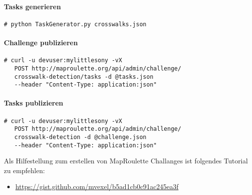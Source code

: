 \paragraph{Tasks generieren}
\begin{lstlisting}[style=BashInputStyle]
 # python TaskGenerator.py crosswalks.json
\end{lstlisting}

\paragraph{Challenge publizieren}
\begin{lstlisting}[style=BashInputStyle]
 # curl -u devuser:mylittlesony -vX 
   POST http://maproulette.org/api/admin/challenge/
   crosswalk-detection/tasks -d @tasks.json 
   --header "Content-Type: application:json"
\end{lstlisting}

\paragraph{Tasks publizieren}
\begin{lstlisting}[style=BashInputStyle]
 # curl -u devuser:mylittlesony -vX 
   POST http://maproulette.org/api/admin/challenge/
   crosswalk-detection -d @challenge.json 
   --header "Content-Type: application:json"
\end{lstlisting}


Als Hilfestellung zum erstellen von MapRoulette Challanges ist folgendes Tutorial zu empfehlen:
\begin{itemize}
	\item \url{https://gist.github.com/mvexel/b5ad1cb0c91ac245ea3f}
\end{itemize}